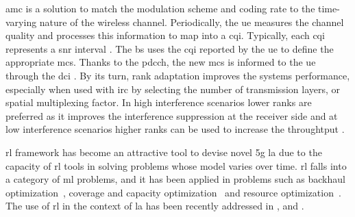 \Gls{amc} is a solution to match the modulation scheme and coding rate to the time-varying nature of the wireless channel.
%
Periodically, the \gls{ue} measures the channel quality and processes this information to map into a \gls{cqi}.
%
Typically, each \gls{cqi} represents a \gls{snr} interval \cite{Blanquez-Casado2016}.
%
The \gls{bs} uses the \gls{cqi} reported by the \gls{ue} to define the appropriate \gls{mcs}.
%
Thanks to the \gls{pdcch}, the new \gls{mcs} is informed to the \gls{ue} through the \gls{dci} \cite{ErikDahlman5G}.
%
By its turn, rank adaptation improves the systems performance, especially when used with \gls{irc} by selecting the number of transmission layers, or spatial multiplexing factor.
%
In high interference scenarios lower ranks are preferred as it improves the interference suppression at the receiver side and at low interference scenarios higher ranks can be used to increase the throughtput \cite{catania2015distributed}.
%

\Gls{rl} framework has become an attractive tool to devise novel \gls{5g} \gls{la} due to the capacity of \gls{rl} tools in solving problems whose model varies over time.
%
%
\Gls{rl} falls into a category of \gls{ml} problems, and it has been applied in problems \cite{survey-son} such as backhaul optimization~\cite{jaber2015}, coverage and capacity optimization~\cite{Fan2014} and resource optimization~\cite{Miozzo2017SwitchOnOffPF}.
%
The use of \gls{rl} in the context of \gls{la} has been recently addressed in \cite{continuousState}, \cite{bruno2014robust} and \cite{DRL_AMC}.

%


